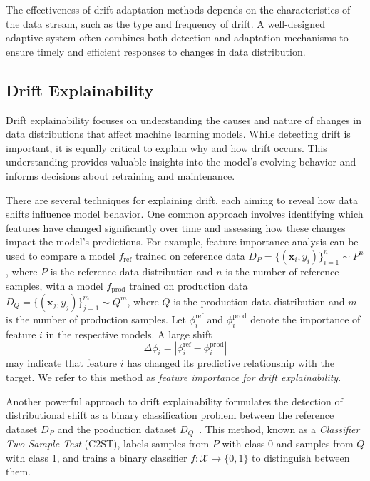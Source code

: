 The effectiveness of drift adaptation methods depends on the characteristics of
the data stream, such as the type and frequency of drift. A well-designed
adaptive system often combines both detection and adaptation mechanisms to
ensure timely and efficient responses to changes in data distribution.

\subsection*{Drift Explainability}\label{subsec:drift_explainability}

Drift explainability focuses on understanding the causes and nature of changes
in data distributions that affect machine learning models. While detecting
drift is important, it is equally critical to explain why and how drift occurs.
This understanding provides valuable insights into the model's evolving
behavior and informs decisions about retraining and maintenance.

There are several techniques for explaining drift, each aiming to reveal how
data shifts influence model behavior. One common approach involves identifying
which features have changed significantly over time and assessing how these
changes impact the model's predictions. For example, feature importance
analysis can be used to compare a model \( f_{\text{ref}} \) trained on
reference data \( D_P = \{(\mathbf{x}_i, y_i)\}_{i=1}^n \sim P^n \), where \( P
\) is the reference data distribution and \( n \) is the number of reference
samples, with a model \( f_{\text{prod}} \) trained on production data \( D_Q =
\{(\mathbf{x}_j, y_j)\}_{j=1}^m \sim Q^m \), where \( Q \) is the production
data distribution and \( m \) is the number of production samples. Let \(
\phi_i^{\text{ref}} \) and \( \phi_i^{\text{prod}} \) denote the importance of
feature \( i \) in the respective models. A large shift
\begin{equation}
    \Delta \phi_i = \left| \phi_i^{\text{ref}} - \phi_i^{\text{prod}} \right|
\end{equation}
may indicate that feature \( i \) has changed its predictive relationship with the target. We refer to this method as
\emph{feature importance for drift explainability}.

Another powerful approach to drift explainability formulates the detection of
distributional shift as a binary classification problem between the reference
dataset $D_P$ and the production dataset
$D_Q$~\cite{revisiting_two_sample_classifier}. This method, known as a
\emph{Classifier Two-Sample Test} (C2ST), labels samples from $P$ with class 0
and samples from $Q$ with class 1, and trains a binary classifier $f:
    \mathcal{X} \rightarrow \{0, 1\}$ to distinguish between them.

